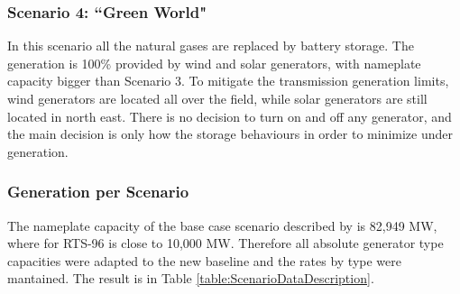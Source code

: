 \documentclass[12pt,LUDisStyle,twosided]{book}
\begin{document}
\subsubsection{Scenario 4: ``Green World"}

In this scenario all the natural gases are replaced by battery storage. The generation is 100\% provided by wind and solar generators, with nameplate capacity bigger than Scenario 3. To mitigate the transmission generation limits, wind generators are located all over the field, while solar generators are still located in north east. There is no decision to turn on and off any generator, and the main decision is only how the storage behaviours in order to minimize under generation.

\subsubsection{Generation per Scenario}

The nameplate capacity of the base case scenario described by \citeauthor{shavel} \cite{shavel} is 82,949 MW, where for RTS-96 is close to 10,000 MW. Therefore all absolute generator type capacities were adapted to the new baseline and the rates by type were mantained. The result is in Table \ref{table:ScenarioDataDescription}.
\end{document}

